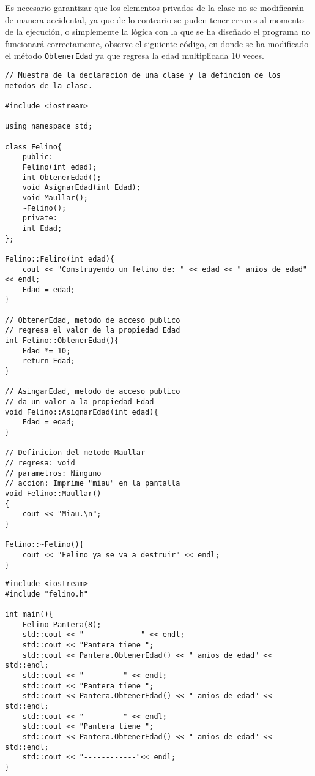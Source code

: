 \documentclass[12pt]{extarticle}
\newcommand{\<}{\langle}
\renewcommand{\>}{\rangle}
\theoremstyle{definition}
\begin{document}
Es necesario garantizar que los elementos privados de la clase no se modificarán de manera accidental, ya que de lo contrario se puden tener errores al momento de la ejecución, o simplemente la lógica con la que se ha diseñado el programa no funcionará correctamente, observe el siguiente código, en donde se ha modificado el método \verb|ObtenerEdad| ya que regresa la edad multiplicada 10 veces. 

\begin{lstlisting}[caption={Se ha modificado el método ObtenerEdad y habrá un error lógico},captionpos=b]
// Muestra de la declaracion de una clase y la defincion de los metodos de la clase.

#include <iostream> 

using namespace std;

class Felino{
	public:
	Felino(int edad);
	int ObtenerEdad();
	void AsignarEdad(int Edad);
	void Maullar();
	~Felino();
	private:
	int Edad;
};

Felino::Felino(int edad){
	cout << "Construyendo un felino de: " << edad << " anios de edad" << endl; 
	Edad = edad;
}

// ObtenerEdad, metodo de acceso publico
// regresa el valor de la propiedad Edad
int Felino::ObtenerEdad(){
	Edad *= 10;
	return Edad;
}

// AsingarEdad, metodo de acceso publico
// da un valor a la propiedad Edad
void Felino::AsignarEdad(int edad){
	Edad = edad;
}

// Definicion del metodo Maullar
// regresa: void
// parametros: Ninguno
// accion: Imprime "miau" en la pantalla
void Felino::Maullar()
{
	cout << "Miau.\n";
}

Felino::~Felino(){
	cout << "Felino ya se va a destruir" << endl; 
}
\end{lstlisting}

\begin{lstlisting}[caption={Programa principal, se utiliza varias veces el método ObtenerEdad y consecuentemente existe un error lógico},captionpos=b]
#include <iostream>
#include "felino.h"

int main(){
	Felino Pantera(8);
	std::cout << "-------------" << endl;
	std::cout << "Pantera tiene ";
	std::cout << Pantera.ObtenerEdad() << " anios de edad" << std::endl; 
	std::cout << "---------" << endl;
	std::cout << "Pantera tiene ";
	std::cout << Pantera.ObtenerEdad() << " anios de edad" << std::endl; 
	std::cout << "---------" << endl;
	std::cout << "Pantera tiene ";
	std::cout << Pantera.ObtenerEdad() << " anios de edad" << std::endl; 
	std::cout << "------------"<< endl;	
}
\end{lstlisting}
\end{document}

